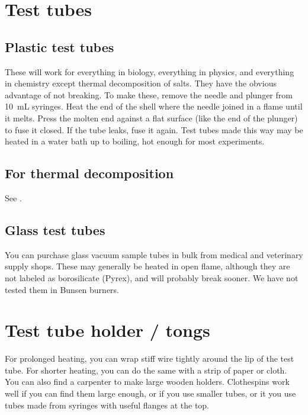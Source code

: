 \section{Test tubes}
\label{sec:testtubes}

\subsection{Plastic test tubes}
These will work for everything in biology, 
everything in physics, 
and everything in chemistry except thermal decomposition of salts. 
They have the obvious advantage of not breaking. 
To make these, 
remove the needle and plunger from 10~mL syringes. 
Heat the end of the shell where the needle joined in a flame until it melts. 
Press the molten end against a flat surface (like the end of the plunger) 
to fuse it closed. 
If the tube leaks, 
fuse it again. 
Test tubes made this way may be heated in a water bath up to boiling, 
hot enough for most experiments.

\subsection{For thermal decomposition}
See .

\subsection{Glass test tubes}
You can purchase glass vacuum sample tubes 
in bulk from medical and veterinary supply shops. 
These may generally be heated in open flame, 
although they are not labeled as borosilicate (Pyrex), 
and will probably break sooner. 
We have not tested them in Bunsen burners.

\section{Test tube holder / tongs}
\label{sec:test-tube-holder}
For prolonged heating, 
you can wrap stiff wire tightly around the lip of the test tube. 
For shorter heating, 
you can do the same with a strip of paper or cloth. 
You can also find a carpenter to make large wooden holders. 
Clothespins work well if you can find them large enough, 
or if you use smaller tubes, 
or it you use tubes made from syringes with useful flanges at the top.

